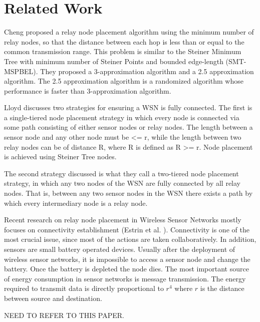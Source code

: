 \section{Related Work}

Cheng \cite{RelaySensor} proposed a relay node placement algorithm using the minimum number of relay nodes, so that the distance between each hop is less than or equal to the common transmission range. This problem is similar to the Steiner Minimum Tree with minimum number of Steiner Points and bounded edge-length (SMT-MSPBEL). They proposed a 3-approximation algorithm and a 2.5 approximation algorithm. The 2.5 approximation algorithm is a randomized algorithm whose performance is faster than 3-approximation algorithm.

Lloyd \cite{1191701} discusses two strategies for ensuring a WSN is fully connected.  The first is a single-tiered node placement strategy in which every node is connected via some path consisting of either sensor nodes or relay nodes.  The length between a sensor node and any other node must be <= r, while the length between two relay nodes can be of distance R, where R is defined as R >= r.  Node placement is achieved using Steiner Tree nodes.

The second strategy discussed is what they call a two-tiered node placement strategy, in which any two nodes of the WSN are fully connected by all relay nodes. That is, between any two sensor nodes in the WSN there exists a path by which every intermediary node is a relay node.

Recent research on relay node placement in Wireless Sensor Networks mostly focuses on connectivity establishment (Estrin et al. \cite{940390}). Connectivity is one of the most crucial issue, since most of the actions are taken collaboratively. In addition, sensors are small battery operated devices. Usually after the deployment of wireless sensor networks, it is impossible to access a sensor node and change the battery. Once the battery is depleted the node dies. The most important source of energy consumption in sensor networks is message transmission. The energy required to transmit data is directly proportional to $r^4$ where $r$ is the distance between source and destination.

NEED TO REFER TO THIS PAPER\cite{596303}.